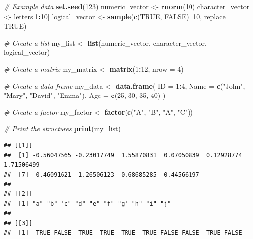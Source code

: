 \documentclass[
]{book}
\newenvironment{Shaded}{\begin{snugshade}}{\end{snugshade}}
\newcommand{\AttributeTok}[1]{\textcolor[rgb]{0.13,0.29,0.53}{#1}}
\newcommand{\CommentTok}[1]{\textcolor[rgb]{0.56,0.35,0.01}{\textit{#1}}}
\newcommand{\ConstantTok}[1]{\textcolor[rgb]{0.56,0.35,0.01}{#1}}
\newcommand{\DecValTok}[1]{\textcolor[rgb]{0.00,0.00,0.81}{#1}}
\newcommand{\FunctionTok}[1]{\textcolor[rgb]{0.13,0.29,0.53}{\textbf{#1}}}
\newcommand{\NormalTok}[1]{#1}
\newcommand{\OtherTok}[1]{\textcolor[rgb]{0.56,0.35,0.01}{#1}}
\newcommand{\SpecialCharTok}[1]{\textcolor[rgb]{0.81,0.36,0.00}{\textbf{#1}}}
\newcommand{\StringTok}[1]{\textcolor[rgb]{0.31,0.60,0.02}{#1}}
\begin{document}
\begin{Shaded}
\begin{Highlighting}[]
\CommentTok{\# Example data}
\FunctionTok{set.seed}\NormalTok{(}\DecValTok{123}\NormalTok{)}
\NormalTok{numeric\_vector }\OtherTok{\textless{}{-}} \FunctionTok{rnorm}\NormalTok{(}\DecValTok{10}\NormalTok{)}
\NormalTok{character\_vector }\OtherTok{\textless{}{-}}\NormalTok{ letters[}\DecValTok{1}\SpecialCharTok{:}\DecValTok{10}\NormalTok{]}
\NormalTok{logical\_vector }\OtherTok{\textless{}{-}} \FunctionTok{sample}\NormalTok{(}\FunctionTok{c}\NormalTok{(}\ConstantTok{TRUE}\NormalTok{, }\ConstantTok{FALSE}\NormalTok{), }\DecValTok{10}\NormalTok{, }\AttributeTok{replace =} \ConstantTok{TRUE}\NormalTok{)}

\CommentTok{\# Create a list}
\NormalTok{my\_list }\OtherTok{\textless{}{-}} \FunctionTok{list}\NormalTok{(numeric\_vector, character\_vector, logical\_vector)}

\CommentTok{\# Create a matrix}
\NormalTok{my\_matrix }\OtherTok{\textless{}{-}} \FunctionTok{matrix}\NormalTok{(}\DecValTok{1}\SpecialCharTok{:}\DecValTok{12}\NormalTok{, }\AttributeTok{nrow =} \DecValTok{4}\NormalTok{)}

\CommentTok{\# Create a data frame}
\NormalTok{my\_data }\OtherTok{\textless{}{-}} \FunctionTok{data.frame}\NormalTok{(}
  \AttributeTok{ID =} \DecValTok{1}\SpecialCharTok{:}\DecValTok{4}\NormalTok{,}
  \AttributeTok{Name =} \FunctionTok{c}\NormalTok{(}\StringTok{"John"}\NormalTok{, }\StringTok{"Mary"}\NormalTok{, }\StringTok{"David"}\NormalTok{, }\StringTok{"Emma"}\NormalTok{),}
  \AttributeTok{Age =} \FunctionTok{c}\NormalTok{(}\DecValTok{25}\NormalTok{, }\DecValTok{30}\NormalTok{, }\DecValTok{35}\NormalTok{, }\DecValTok{40}\NormalTok{)}
\NormalTok{)}

\CommentTok{\# Create a factor}
\NormalTok{my\_factor }\OtherTok{\textless{}{-}} \FunctionTok{factor}\NormalTok{(}\FunctionTok{c}\NormalTok{(}\StringTok{"A"}\NormalTok{, }\StringTok{"B"}\NormalTok{, }\StringTok{"A"}\NormalTok{, }\StringTok{"C"}\NormalTok{))}

\CommentTok{\# Print the structures}
\FunctionTok{print}\NormalTok{(my\_list)}
\end{Highlighting}
\end{Shaded}

\begin{verbatim}
## [[1]]
##  [1] -0.56047565 -0.23017749  1.55870831  0.07050839  0.12928774  1.71506499
##  [7]  0.46091621 -1.26506123 -0.68685285 -0.44566197
## 
## [[2]]
##  [1] "a" "b" "c" "d" "e" "f" "g" "h" "i" "j"
## 
## [[3]]
##  [1]  TRUE FALSE  TRUE  TRUE  TRUE  TRUE FALSE FALSE  TRUE FALSE
\end{verbatim}
\end{document}
